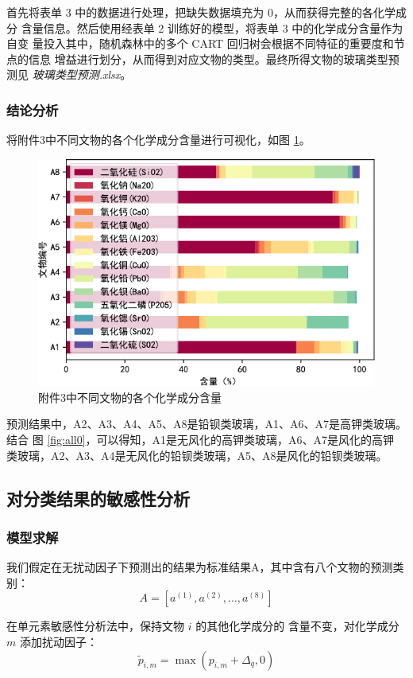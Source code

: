 \documentclass[withoutpreface,bwprint]{cumcmthesis} %
\begin{document}
首先将表单 3 中的数据进行处理，把缺失数据填充为 0，从而获得完整的各化学成分
含量信息。然后使用经表单 2 训练好的模型，将表单 3 中的化学成分含量作为自变
量投入其中，随机森林中的多个 CART 回归树会根据不同特征的重要度和节点的信息
增益进行划分，从而得到对应文物的类型。最终所得文物的玻璃类型预测见
\emph{玻璃类型预测.xlsx}。

\subsubsection{结论分析}
将附件3中不同文物的各个化学成分含量进行可视化，如图 \ref{fig:visual2}。
\begin{figure}[!htb]
    \centering
    \includegraphics{附件3中不同文物的各个化学成分含量.pdf}
    \caption{附件3中不同文物的各个化学成分含量}
    \label{fig:visual2}
\end{figure}

预测结果中，A2、A3、A4、A5、A8是铅钡类玻璃，A1、A6、A7是高钾类玻璃。结合
图 \ref{fig:all0}，可以得知，A1是无风化的高钾类玻璃，A6、A7是风化的高钾
类玻璃，A2、A3、A4是无风化的铅钡类玻璃，A5、A8是风化的铅钡类玻璃。

\subsection{对分类结果的敏感性分析}
\subsubsection{模型求解}
我们假定在无扰动因子下预测出的结果为标准结果A，其中含有八个文物的预测类别：
\[
    A=[a^{(1)},a^{(2)},\dots,a^{(8)}]
\]

在单元素敏感性分析法中，保持文物 $i$ 的其他化学成分的
含量不变，对化学成分 $m$ 添加扰动因子：
\[
    \widetilde{p}_{i,m}=\max(p_{i,m}+\Delta_q, 0) 
\]
\end{document}
